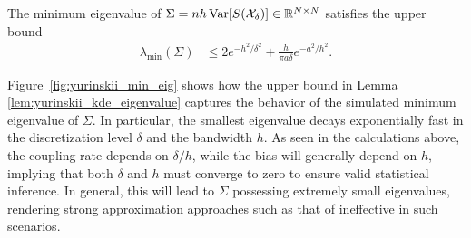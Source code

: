 \begin{lemma}%
  \label{lem:yurinskii_kde_eigenvalue}
  The minimum eigenvalue of
  $\Sigma=n h\operatorname{Var}[S(\mathcal{X}_\delta)] \in \mathbb{R}^{N \times N}$
  satisfies the upper bound
  \begin{align*}
    \lambda_{\min}(\Sigma)
    &\leq
    2 e^{-h^2/\delta^2}
    + \frac{h}{\pi a \delta}
    e^{-a^2 / h^2}.
  \end{align*}
\end{lemma}
%
Figure~\ref{fig:yurinskii_min_eig} shows how the upper bound in Lemma
\ref{lem:yurinskii_kde_eigenvalue} captures the behavior of the simulated
minimum
eigenvalue of $\Sigma$. In particular, the smallest eigenvalue decays
exponentially fast in the discretization level $\delta$ and the bandwidth $h$.
As seen in the calculations above, the coupling rate depends on $\delta / h$,
while the bias will generally depend on $h$, implying that both $\delta$ and
$h$ must converge to zero to ensure valid statistical inference. In general,
this will lead to $\Sigma$ possessing extremely small eigenvalues, rendering
strong approximation approaches such as that of \citet{li2020uniform}
ineffective in such scenarios.
%
